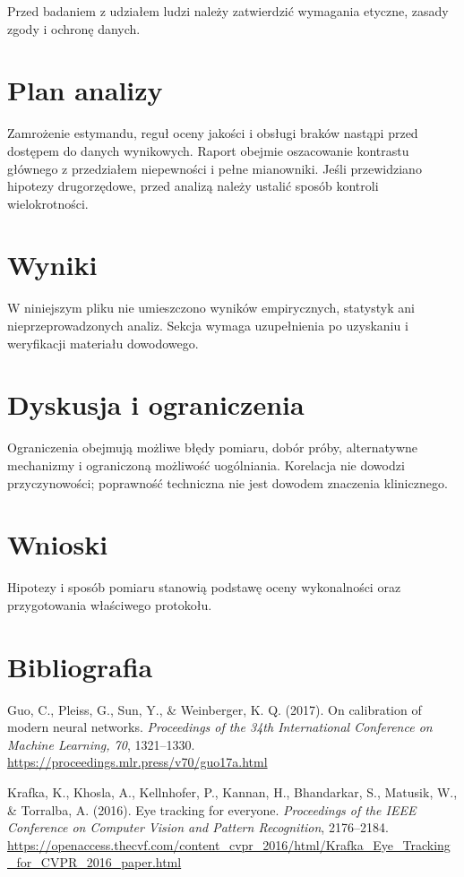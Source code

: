 \documentclass[11pt,a4paper]{article}
\begin{document}
Przed badaniem z udziałem ludzi należy zatwierdzić wymagania etyczne, zasady zgody i ochronę danych.

\section{Plan analizy}

Zamrożenie estymandu, reguł oceny jakości i obsługi braków nastąpi przed dostępem do danych wynikowych. Raport obejmie oszacowanie kontrastu głównego z przedziałem niepewności i pełne mianowniki. Jeśli przewidziano hipotezy drugorzędowe, przed analizą należy ustalić sposób kontroli wielokrotności.

\section{Wyniki}

W niniejszym pliku nie umieszczono wyników empirycznych, statystyk ani nieprzeprowadzonych analiz. Sekcja wymaga uzupełnienia po uzyskaniu i weryfikacji materiału dowodowego.

\section{Dyskusja i ograniczenia}

Ograniczenia obejmują możliwe błędy pomiaru, dobór próby, alternatywne mechanizmy i ograniczoną możliwość uogólniania. Korelacja nie dowodzi przyczynowości; poprawność techniczna nie jest dowodem znaczenia klinicznego.

\section{Wnioski}

Hipotezy i sposób pomiaru stanowią podstawę oceny wykonalności oraz przygotowania właściwego protokołu.

\section*{Bibliografia}

{\setlength{\parindent}{0pt}
\setlength{\parskip}{5pt}
\hangindent=1.27cm
Guo, C., Pleiss, G., Sun, Y., \& Weinberger, K. Q. (2017). On calibration of modern neural networks. \textit{Proceedings of the 34th International Conference on Machine Learning, 70}, 1321--1330. \url{https://proceedings.mlr.press/v70/guo17a.html}\par
\hangindent=1.27cm
Krafka, K., Khosla, A., Kellnhofer, P., Kannan, H., Bhandarkar, S., Matusik, W., \& Torralba, A. (2016). Eye tracking for everyone. \textit{Proceedings of the IEEE Conference on Computer Vision and Pattern Recognition}, 2176--2184. \url{https://openaccess.thecvf.com/content_cvpr_2016/html/Krafka_Eye_Tracking_for_CVPR_2016_paper.html}\par
}
\end{document}
